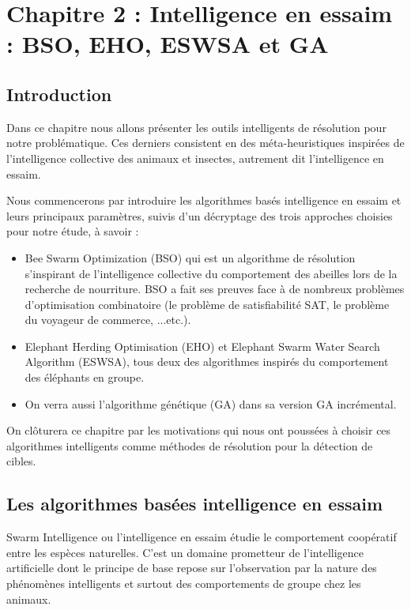 \chapter{Chapitre 2 : Intelligence en essaim : BSO, EHO, ESWSA et GA} %

\label{Chapter2} %



\vspace{-0.5cm}
\section{Introduction}
Dans ce chapitre nous allons présenter les outils intelligents de résolution pour notre problématique. Ces derniers consistent en des méta-heuristiques inspirées de l'intelligence collective des animaux et insectes, autrement dit l’intelligence en essaim.

Nous commencerons par introduire les algorithmes basés intelligence en essaim et leurs principaux paramètres, suivis d'un décryptage des trois approches choisies pour notre étude, à savoir :
\begin{itemize}
	
	\item Bee Swarm Optimization (BSO) qui est un algorithme de résolution s'inspirant de l'intelligence collective du comportement des abeilles lors de la recherche de nourriture. BSO a fait ses preuves face à de nombreux problèmes d'optimisation combinatoire (le problème de satisfiabilité SAT, le problème du voyageur de commerce, ...etc.).
	
	\item Elephant Herding Optimisation (EHO) et Elephant Swarm Water Search Algorithm (ESWSA), tous deux des algorithmes inspirés du comportement des éléphants en groupe.
	
	\item On verra aussi l'algorithme génétique (GA) dans sa version GA incrémental.
\end{itemize}

On clôturera ce chapitre par les motivations qui nous ont poussées à choisir ces algorithmes intelligents comme méthodes de résolution pour la détection de cibles.


\section{Les algorithmes basées intelligence en essaim}
Swarm Intelligence ou l’intelligence en essaim étudie le comportement coopératif entre les espèces naturelles. C’est un domaine prometteur de l'intelligence artificielle dont le principe de base repose sur l'observation par la nature des phénomènes intelligents et surtout des comportements de groupe chez les animaux.

